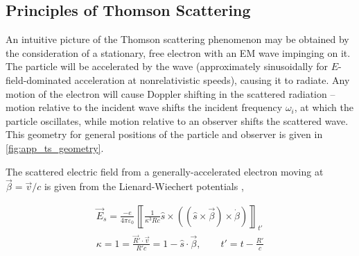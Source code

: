 \subsection{Principles of Thomson Scattering}\label{subsec:app_background}

An intuitive picture of the Thomson scattering phenomenon may be obtained by the consideration of a stationary, free electron with an EM wave impinging on it.  The particle will be accelerated by the wave (approximately sinusoidally for $E$-field-dominated acceleration at nonrelativistic speeds), causing it to radiate.  Any motion of the electron will cause Doppler shifting in the scattered radiation -- motion relative to the incident wave shifts the incident frequency $\omega_i$, at which the particle oscillates, while motion relative to an observer shifts the scattered wave.  This geometry for general positions of the particle and observer is given in \cref{fig:app_ts_geometry}.

\begin{figure}[t]
 \pushtooutside
\end{figure}

The scattered electric field from a generally-accelerated electron moving at $\vec{\beta} = \vec{v}/c$ is given from the Lienard-Wiechert potentials \cite[\S 7]{Hutchinson},

\begin{equation}\label{eq:LienardWiechert}
 \begin{gathered}
  \vec{E}_s = \frac{-e}{4\pi\varepsilon_0} \left\llbracket \frac{1}{\kappa^3 Rc} \hat{s} \times \left( \left(\hat{s} \times \vec{\beta}\right) \times \dot{\beta}\right)\right\rrbracket_{t'}\\
  \kappa = 1 = \frac{\vec{R}' \cdot \vec{v}}{R'c} = 1 - \hat{s} \cdot \vec{\beta}, \qquad t' = t - \frac{R'}{c}
  \end{gathered}
\end{equation}

